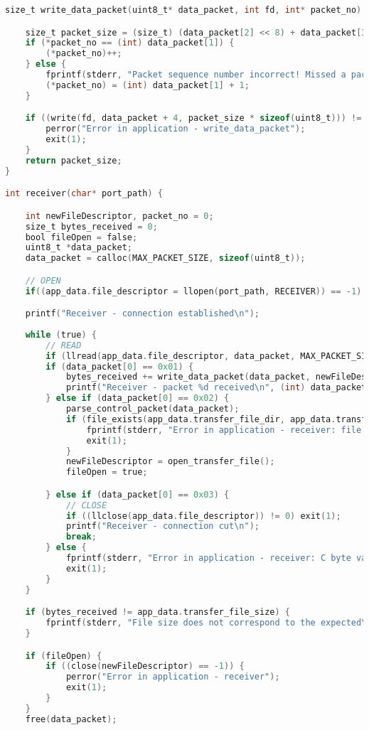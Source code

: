 \begin{lstlisting}[language=C, caption=application.c]
size_t write_data_packet(uint8_t* data_packet, int fd, int* packet_no) {

    size_t packet_size = (size_t) (data_packet[2] << 8) + data_packet[3];
    if (*packet_no == (int) data_packet[1]) {
        (*packet_no)++;
    } else {
        fprintf(stderr, "Packet sequence number incorrect! Missed a packet\n");
        (*packet_no) = (int) data_packet[1] + 1;
    }

    if ((write(fd, data_packet + 4, packet_size * sizeof(uint8_t))) != packet_size) {
        perror("Error in application - write_data_packet");
        exit(1);
    }
    return packet_size;
}

int receiver(char* port_path) {

    int newFileDescriptor, packet_no = 0;
    size_t bytes_received = 0;
    bool fileOpen = false;
    uint8_t *data_packet;
    data_packet = calloc(MAX_PACKET_SIZE, sizeof(uint8_t));

    // OPEN
    if((app_data.file_descriptor = llopen(port_path, RECEIVER)) == -1) exit(1);

    printf("Receiver - connection established\n");
    
    while (true) {
        // READ
        if (llread(app_data.file_descriptor, data_packet, MAX_PACKET_SIZE) == -1) exit(1);
        if (data_packet[0] == 0x01) {
            bytes_received += write_data_packet(data_packet, newFileDescriptor, &packet_no);
            printf("Receiver - packet %d received\n", (int) data_packet[1]);
        } else if (data_packet[0] == 0x02) {
            parse_control_packet(data_packet);
            if (file_exists(app_data.transfer_file_dir, app_data.transfer_file_name)) {
                fprintf(stderr, "Error in application - receiver: file already exists\n");
                exit(1);
            }
            newFileDescriptor = open_transfer_file();
            fileOpen = true;

        } else if (data_packet[0] == 0x03) {
            // CLOSE
            if ((llclose(app_data.file_descriptor)) != 0) exit(1);
            printf("Receiver - connection cut\n");
            break;
        } else {
            fprintf(stderr, "Error in application - receiver: C byte value invalid\n");
            exit(1);
        }
    }

    if (bytes_received != app_data.transfer_file_size) {
        fprintf(stderr, "File size does not correspond to the expected\n");
    }

    if (fileOpen) {
        if ((close(newFileDescriptor) == -1)) {
            perror("Error in application - receiver");
            exit(1);
        }
    }
    free(data_packet);
    

\end{lstlisting}
